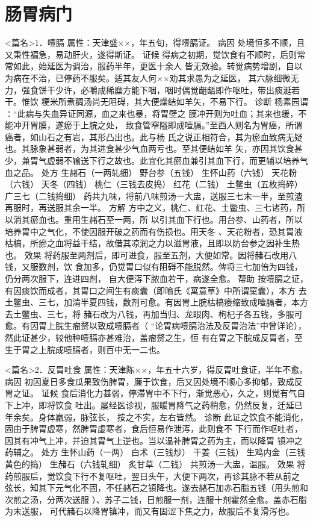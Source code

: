 \documentclass[a4paper,12pt,UTF8,twoside]{ctexbook}
\begin{document}
\chapter{肠胃病门}
<篇名>1．噎膈
属性：天津盛××，年五旬，得噎膈证。 
病因 处境恒多不顺，且又秉性褊急，易动肝火，遂得斯证。 
证候 得病之初期，觉饮食有不顺时，后则常常如此，始延医为调治，服药半年，更医十余人 
皆无效验。转觉病势增剧，自以为病在不治，已停药不服矣。适其友人何××劝其求愚为之延医， 
其六脉细微无力，强食饼干少许，必嚼成稀糜方能下咽，咽时偶觉龃龉即作呕吐，带出痰涎若干。惟饮 
粳米所煮稠汤尚无阻碍，其大便燥结如羊矢，不易下行。 
诊断 杨素园谓∶“此病与失血异证同源，血之来也暴，将胃壁之 
膜冲开则为吐血；其来也缓，不能冲开胃膜，遂瘀于上脘之处， 
致食管窄隘即成噎膈。”至西人则名为胃癌，所谓癌者，如山石之有岩，其形凸出也。此与杨 
氏之说正相符合，其为瘀血致病无疑也。其脉象甚弱者，为其进食甚少气血两亏也。至其便结如羊 
矢，亦因其饮食甚少，兼胃气虚弱不输送下行之故也。此宜化其瘀血兼引其血下行，而更辅以培养气血之品。 
处方 生赭石（一两轧细） 野台参（五钱） 生怀山药（六钱） 天花粉（六钱） 
天冬（四钱） 桃仁（三钱去皮捣） 红花（二钱） 土鳖虫（五枚捣碎） 广三七（二钱捣细） 
药共九味，将前八味煎汤一大盅，送服三七末一半，至煎渣再服时，再送服其余一半。 
方解 方中之义，桃仁、红花、土鳖虫、三七诸药，所以消其瘀血也。重用生赭石至一两，所 
以引其血下行也。用台参、山药者，所以培养胃中之气化，不使因服开破之药而有伤损也。用天冬 
、天花粉者，恐其胃液枯槁，所瘀之血将益干结，故借其凉润之力以滋胃液，且即以防台参之因补生热也。 
效果 将药服至两剂后，即可进食，服至五剂，大便如常。因将赭石改用八钱，又服数剂，饮 
食加多，仍觉胃口似有阻碍不能脱然。俾将三七加倍为四钱，仍分两次服下，连进四剂， 
自大便泻下脓血若干，病遂全愈。 
帮助 按噎膈之证，有因痰饮而成者，其胃口之间生有痰囊（即喻氏《寓意草》中所谓窠囊），本方 
去土鳖虫、三七，加清半夏四钱，数剂可愈。有因胃上脘枯槁痿缩致成噎膈者，本方去土鳖虫、三七，将 
赭石改为八钱，再加当归、龙眼肉、枸杞子各五钱，多服可愈。有因胃上脘生瘤赘以致成噎膈者（ 
“论胃病噎膈治法及反胃治法”中曾详论），然此证甚少，较他种噎膈亦甚难治，盖瘤赘之生，恒 
有在胃之下脘成反胃者，至生于胃之上脘成噎膈者，则百中无一二也。 


<篇名>2．反胃吐食
属性：天津陈××，年五十六岁，得反胃吐食证，半年不愈。 
病因 初因夏日多食瓜果致伤脾胃，廉于饮食，后又因处境不顺心多抑郁，致成反胃之证。 
证候 食后消化力甚弱，停滞胃中不下行，渐觉恶心，久之，则觉有气自下上冲，即将饮食 
吐出。屡经医诊视，服暖胃降气之药稍愈，仍然反复，迁延已年余矣。身体羸弱，脉弦长， 
按之不实，左右皆然。 
诊断 此证之饮食不能消化，固由于脾胃虚寒，然脾胃虚寒者，食后恒易作泄泻，此则食不 
下行而作呕吐者，因其有冲气上冲，并迫其胃气上逆也。当以温补脾胃之药为主，而以降胃 
镇冲之药辅之。 
处方 生怀山药（一两） 白术（三钱炒） 干姜（三钱） 生鸡内金（三钱黄色的捣） 
生赭石（六钱轧细） 炙甘草（二钱） 
共煎汤一大盅，温服。 
效果 将药煎服后，觉饮食下行不复呕吐，翌日头午，大便下两次，再诊其脉不若从前之 
弦长，知其下元气化不固，不任赭石之镇降也。遂去赭石加赤石脂五钱（用头煎和次煎之汤，分两次送服 
）、苏子二钱，日煎服一剂，连服十剂霍然全愈。盖赤石脂为末送服， 
可代赭石以降胃镇冲，而又有固涩下焦之力，故服后不复滑泻也。 
\end{document}
